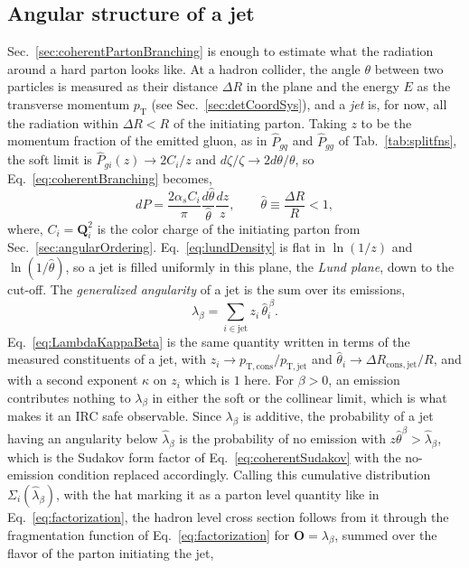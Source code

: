 \subsection{Angular structure of a jet}
\label{sec:angularityEstimate}
Sec.~\ref{sec:coherentPartonBranching} is enough to estimate what the radiation around a hard parton looks like.
%
At a hadron collider, the angle \(\theta\) between two particles is measured as their distance \(\Delta R\) in the \etaphi plane and the energy \(E\) as the transverse momentum \(p_\mathrm{T}\) (see Sec.~\ref{sec:detCoordSys}), and a \emph{jet} is, for now, all the radiation within \(\Delta R < R\) of the initiating parton.
%
Taking \(z\) to be the momentum fraction of the emitted gluon, as in \(\hat{P}_{gq}\) and \(\hat{P}_{gg}\) of Tab.~\ref{tab:splitfns}, the soft limit is \(\hat{P}_{gi}(z) \to 2C_i/z\) and \(d\zeta/\zeta \to 2d\theta/\theta\), so Eq.~\ref{eq:coherentBranching} becomes,
\begin{equation}
	dP = \frac{2\alpha_s C_i}{\pi}\frac{d\hat{\theta}}{\hat{\theta}}\frac{dz}{z}, \qquad \hat{\theta} \equiv \frac{\Delta R}{R} < 1,
	\label{eq:lundDensity}
\end{equation}
where, \(C_i = \mathbf{Q}_i^2\) is the color charge of the initiating parton from Sec.~\ref{sec:angularOrdering}.
%
Eq.~\ref{eq:lundDensity} is flat in \(\ln(1/z)\) and \(\ln(1/\hat{\theta})\), so a jet is filled uniformly in this plane, the \emph{Lund plane}, down to the cut-off.
%
The \emph{generalized angularity} of a jet is the sum over its emissions,
\begin{equation}
	\lambda_\beta = \sum_{i \in \mathrm{jet}} z_i\,\hat{\theta}_i^{\,\beta}.
	\label{eq:angularityShower}
\end{equation}
Eq.~\ref{eq:LambdaKappaBeta} is the same quantity written in terms of the measured constituents of a jet, with \(z_i \to p_\mathrm{T, cons}/p_\mathrm{T, jet}\) and \(\hat{\theta}_i \to \Delta R_\mathrm{cons, jet}/R\), and with a second exponent \(\kappa\) on \(z_i\) which is \(1\) here.
%
For \(\beta > 0\), an emission contributes nothing to \(\lambda_\beta\) in either the soft or the collinear limit, which is what makes it an IRC safe observable.
%
Since \(\lambda_\beta\) is additive, the probability of a jet having an angularity below \(\hat{\lambda}_\beta\) is the probability of no emission with \(z\hat{\theta}^\beta > \hat{\lambda}_\beta\), which is the Sudakov form factor of Eq.~\ref{eq:coherentSudakov} with the no-emission condition replaced accordingly.
%
Calling this cumulative distribution \(\Sigma_i(\hat{\lambda}_\beta)\), with the hat marking it as a parton level quantity like in Eq.~\ref{eq:factorization}, the hadron level cross section follows from it through the fragmentation function of Eq.~\ref{eq:factorization} for \(\mathbf{O} = \lambda_\beta\), summed over the flavor of the parton initiating the jet,
